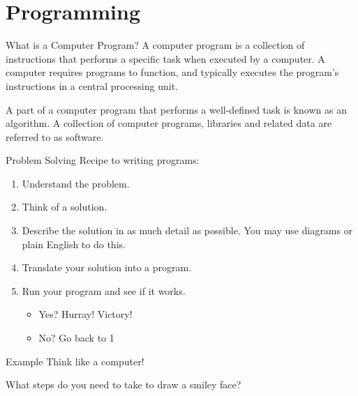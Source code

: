 \documentclass[../lecture1-introduction.tex]{subfiles}
\begin{document}
\section{Programming}


\begin{frame}[fragile]{What is a Computer Program?}
    A computer program is a collection of instructions that performs a specific
    task when executed by a computer. A computer requires programs to function,
    and typically executes the program's instructions in a central processing unit.

    A part of a computer program that performs a well-defined task is known as
    an algorithm. A collection of computer programs, libraries and related data
    are referred to as software.
\end{frame}


\begin{frame}[fragile]{Problem Solving}
    Recipe to writing programs:
    \begin{enumerate}
        \item Understand the problem. \pause
        \item Think of a solution. \pause
        \item Describe the solution in as much detail as possible. \newline
              You may use diagrams or plain English to do this. \pause
        \item Translate your solution into a program. \pause
        \item Run your program and see if it works. \pause
        \begin{itemize}
            \item Yes? Hurray! Victory! \pause
            \item No? Go back to 1
        \end{itemize}
    \end{enumerate}
\end{frame}


\begin{frame}[fragile]{Example}
    Think like a computer! \newline

    What steps do you need to take to draw a smiley face?
\end{frame}
\end{document}
